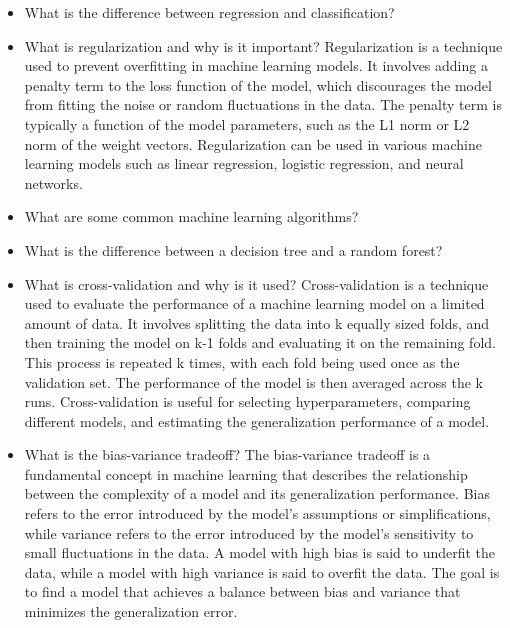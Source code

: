 \documentclass[11pt]{article}
\begin{document}
\begin{enumerate}
\begin{itemize}
\item What is the difference between regression and classification?

\item What is regularization and why is it important? Regularization is a technique used to prevent overfitting in machine learning models. It involves adding a penalty term to the loss function of the model, which discourages the model from fitting the noise or random fluctuations in the data. The penalty term is typically a function of the model parameters, such as the L1 norm or L2 norm of the weight vectors. Regularization can be used in various machine learning models such as linear regression, logistic regression, and neural networks.

\item What are some common machine learning algorithms?

\item What is the difference between a decision tree and a random forest?

\item What is cross-validation and why is it used? Cross-validation is a technique used to evaluate the performance of a machine learning model on a limited amount of data. It involves splitting the data into k equally sized folds, and then training the model on k-1 folds and evaluating it on the remaining fold. This process is repeated k times, with each fold being used once as the validation set. The performance of the model is then averaged across the k runs. Cross-validation is useful for selecting hyperparameters, comparing different models, and estimating the generalization performance of a model.

\item What is the bias-variance tradeoff? The bias-variance tradeoff is a fundamental concept in machine learning that describes the relationship between the complexity of a model and its generalization performance. Bias refers to the error introduced by the model's assumptions or simplifications, while variance refers to the error introduced by the model's sensitivity to small fluctuations in the data. A model with high bias is said to underfit the data, while a model with high variance is said to overfit the data. The goal is to find a model that achieves a balance between bias and variance that minimizes the generalization error.


\end{itemize}
\end{enumerate}
\end{document}
